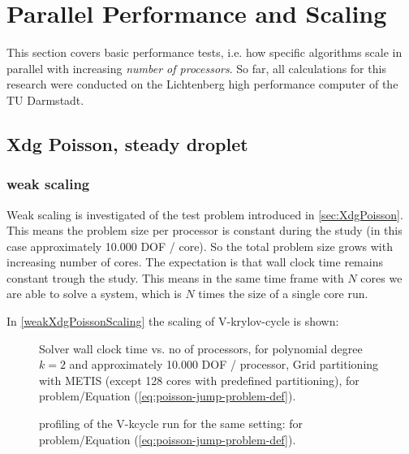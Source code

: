 \documentclass[a4paper,10pt]{report} %
\begin{document}
\chapter{Parallel Performance and Scaling}
This section covers basic performance tests, i.e. how specific algorithms scale in parallel with increasing \emph{number of processors}. So far, all calculations for this research were conducted on the Lichtenberg high performance computer of the TU Darmstadt.

\section{ Xdg Poisson, steady droplet }
\subsection{weak scaling}
Weak scaling is investigated of the test problem introduced in \ref{sec:XdgPoisson}. This means the problem size per processor is constant during the study (in this case approximately 10.000 DOF / core). So the total problem size grows with increasing number of cores. The expectation is that wall clock time remains constant trough the study. This means in the same time frame with $N$ cores we are able to solve a system, which is $N$ times the size of a single core run.

In \ref{weakXdgPoissonScaling} the scaling of V-krylov-cycle is shown:

\graphicspath{{./apdx-MPISolverPerformance/weakScaling/XdgPoisson/plots/}} 
\begin{figure}[h!]
	\begin{center}
		
	\end{center}
	\caption{
		Solver wall clock time vs. no of processors, for polynomial degree $k=2$ and approximately 10.000 DOF / processor, Grid partitioning with METIS (except 128 cores with predefined partitioning),
		for problem/Equation (\ref{eq:poisson-jump-problem-def}).
	}
	\label{fig:weakXdgPoissonScaling}
\end{figure}

\begin{figure}[h!]
	\begin{center}
		
	\end{center}
	\caption{
		profiling of the V-kcycle run for the same setting:
		for problem/Equation (\ref{eq:poisson-jump-problem-def}).
	}
	\label{fig:weakXdgPoisson-kcycle-profiling}
\end{figure}
\end{document}
